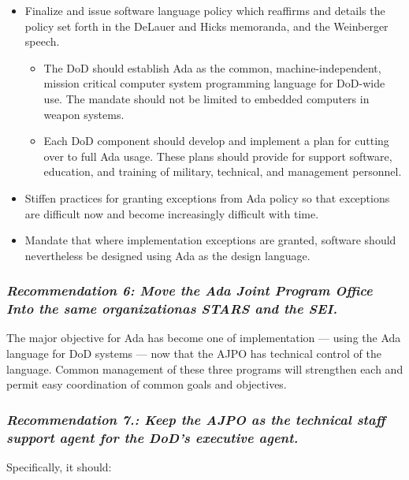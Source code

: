\documentclass[12pt]{article}
\begin{document}
\begin{itemize}
    \item Finalize and issue software language policy which reaffirms and
        details the policy set forth in the DeLauer and Hicks memoranda, and
        the Weinberger speech.
\begin{itemize}
    \item The DoD should establish Ada as the common, machine-independent,
        mission critical computer system programming language for DoD-wide use.
        The mandate should not be limited to embedded computers in weapon
        systems.
    \item Each DoD component should develop and implement a plan for cutting
        over to full Ada usage. These plans should provide for support
        software, education, and training of military, technical, and
        management personnel.
\end{itemize}
    \item Stiffen practices for granting exceptions from Ada policy so that
        exceptions are difficult now and become increasingly difficult with
        time.
    \item Mandate that where implementation exceptions are granted, software
        should nevertheless be designed using Ada as the design language.
\end{itemize}

\subsubsection*{\textit{Recommendation 6: Move the Ada Joint Program Office
Into the same organizationas STARS and the SEI.}}

The major objective for Ada has become one of implementation — using the Ada
language for DoD systems — now that the AJPO has technical control of the
language. Common management of these three programs will strengthen each and
permit easy coordination of common goals and objectives.

\subsubsection*{\textit{Recommendation 7.: Keep the AJPO as the technical staff support agent
for the DoD's executive agent.}}

Specifically, it should:
\end{document}
